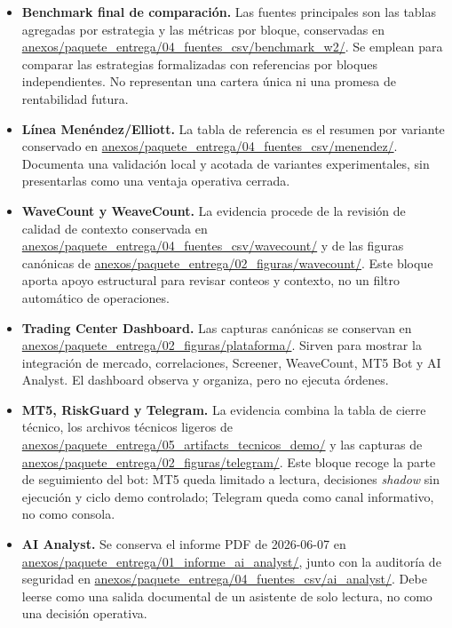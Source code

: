 \begin{itemize}
  \item \textbf{Benchmark final de comparaci\'on.} Las fuentes principales son
  las tablas agregadas por estrategia y las m\'etricas por bloque, conservadas en
  \url{anexos/paquete_entrega/04_fuentes_csv/benchmark_w2/}.
  Se emplean para comparar las estrategias formalizadas con referencias por
  bloques independientes. No representan una cartera \'unica ni una promesa de
  rentabilidad futura.

  \item \textbf{L\'inea Men\'endez/Elliott.} La tabla de referencia es
  el resumen por variante conservado en
  \url{anexos/paquete_entrega/04_fuentes_csv/menendez/}. Documenta una
  validaci\'on local y acotada de variantes experimentales, sin presentarlas como
  una ventaja operativa cerrada.

  \item \textbf{WaveCount y WeaveCount.} La evidencia procede de
  la revisi\'on de calidad de contexto conservada en
  \url{anexos/paquete_entrega/04_fuentes_csv/wavecount/} y de las figuras
  can\'onicas de \url{anexos/paquete_entrega/02_figuras/wavecount/}. Este bloque
  aporta apoyo estructural para revisar conteos y contexto, no un filtro
  autom\'atico de operaciones.

  \item \textbf{Trading Center Dashboard.} Las capturas can\'onicas se conservan
  en \url{anexos/paquete_entrega/02_figuras/plataforma/}. Sirven para mostrar la
  integraci\'on de mercado, correlaciones, Screener, WeaveCount, MT5 Bot y AI
  Analyst. El dashboard observa y organiza, pero no ejecuta \'ordenes.

  \item \textbf{MT5, RiskGuard y Telegram.} La evidencia combina la tabla
  de cierre t\'ecnico, los archivos t\'ecnicos ligeros de
  \url{anexos/paquete_entrega/05_artifacts_tecnicos_demo/} y las capturas de
  \url{anexos/paquete_entrega/02_figuras/telegram/}. Este bloque recoge la parte
  de seguimiento del bot: MT5 queda limitado a lectura, decisiones
  \textit{shadow} sin ejecuci\'on y ciclo demo controlado; Telegram queda como
  canal informativo, no como consola.

  \item \textbf{AI Analyst.} Se conserva el informe
  PDF de 2026-06-07 en \url{anexos/paquete_entrega/01_informe_ai_analyst/},
  junto con la auditor\'ia de seguridad en
  \url{anexos/paquete_entrega/04_fuentes_csv/ai_analyst/}. Debe leerse como una
  salida documental de un asistente de solo lectura, no como una decisi\'on
  operativa.
\end{itemize}

